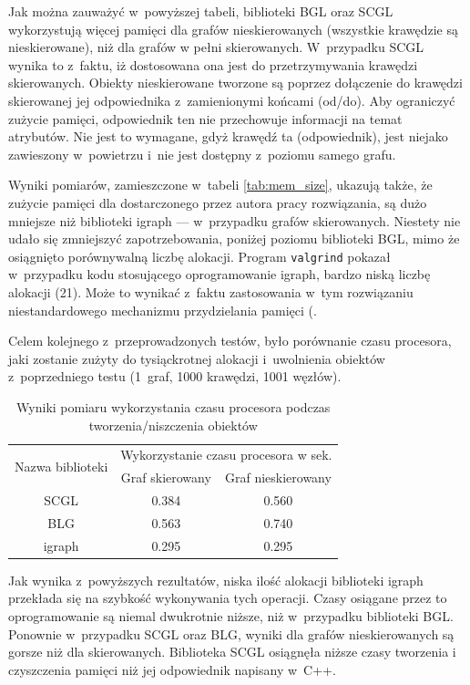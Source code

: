 \documentclass[a4paper,12pt,polish,oneside]{thesis}
\newcommand\code[1]{\lstinline[style=line]{#1}}
\begin{document}
Jak można zauważyć w~powyższej tabeli, biblioteki BGL oraz SCGL wykorzystują więcej pamięci dla grafów nieskierowanych (wszystkie krawędzie są nieskierowane), niż dla grafów w pełni skierowanych.
W~przypadku SCGL wynika to z~faktu, iż dostosowana ona jest do przetrzymywania krawędzi skierowanych.
Obiekty nieskierowane tworzone są poprzez dołączenie do krawędzi skierowanej jej odpowiednika z~zamienionymi końcami (od/do).
Aby ograniczyć zużycie pamięci, odpowiednik ten nie przechowuje informacji na temat atrybutów.
Nie jest to wymagane, gdyż krawędź ta (odpowiednik), jest niejako zawieszony w~powietrzu i~nie jest dostępny z~poziomu samego grafu.

Wyniki pomiarów, zamieszczone w~tabeli \ref{tab:mem_size}, ukazują także, że zużycie pamięci dla dostarczonego przez autora pracy rozwiązania, są dużo mniejsze niż biblioteki igraph --- w~przypadku grafów skierowanych.
Niestety nie udało się zmniejszyć zapotrzebowania, poniżej poziomu biblioteki BGL, mimo że osiągnięto porównywalną liczbę alokacji.
Program \code{valgrind} pokazał w~przypadku kodu stosującego oprogramowanie igraph, bardzo niską liczbę alokacji (21).
Może to wynikać z~faktu zastosowania w~tym rozwiązaniu niestandardowego mechanizmu przydzielania pamięci (.

Celem kolejnego z~przeprowadzonych testów, było porównanie czasu procesora, jaki zostanie zużyty do tysiąckrotnej alokacji i~uwolnienia obiektów z~poprzedniego testu (1~graf, 1000 krawędzi, 1001 węzłów).
\begin{table}[htb]
\caption{Wyniki pomiaru wykorzystania czasu procesora podczas tworzenia/niszczenia obiektów}
\label{tab:mem_speed}
\centering
\begin{tabular}{ | c | c | c | }
	\hline
	\multirow{2}{*}{Nazwa biblioteki } & \multicolumn{2}{|c|}{Wykorzystanie czasu procesora w sek.} \\
	\cline{2-3}
		& Graf skierowany & Graf nieskierowany \\
	\hline \hline
	SCGL    & 0.384 & 0.560 \\ \hline
	BLG     & 0.563 & 0.740 \\ \hline
	igraph  & 0.295 & 0.295 \\ \hline
\end{tabular}
\end{table}
Jak wynika z~powyższych rezultatów, niska ilość alokacji biblioteki igraph przekłada się na szybkość wykonywania tych operacji.
Czasy osiągane przez to oprogramowanie są niemal dwukrotnie niższe, niż w~przypadku biblioteki BGL.
Ponownie w~przypadku SCGL oraz BLG, wyniki dla grafów nieskierowanych są gorsze niż dla skierowanych.
Biblioteka SCGL osiągnęła niższe czasy tworzenia i czyszczenia pamięci niż jej odpowiednik napisany w~C++.
\end{document}
